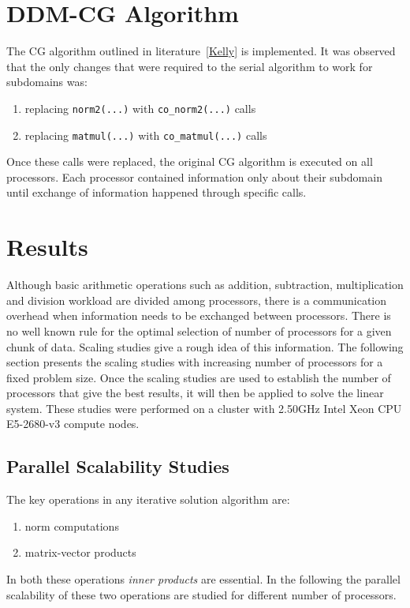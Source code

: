 \documentclass[12pt]{report}
\begin{document}
\section{DDM-CG Algorithm}

The CG algorithm outlined in literature~\ref{Kelly} is implemented. It
was observed that the only changes that were required to the serial
algorithm to work for subdomains was:
\begin{enumerate}
\item replacing \texttt{norm2(...)} with \texttt{co\_norm2(...)} calls
\item replacing \texttt{matmul(...)} with \texttt{co\_matmul(...)} calls
\end{enumerate}
Once these calls were replaced, the original CG algorithm is
executed on all processors. Each processor contained information only
about their subdomain until exchange of information happened through
specific calls.

\section{Results}

Although basic arithmetic operations such as addition, subtraction,
multiplication and division workload are divided among processors,
there is a communication overhead when information needs to be
exchanged between processors. There is no well known rule for the
optimal selection of number of processors for a given chunk of
data. Scaling studies give a rough idea of this information.  The
following section presents the scaling studies with increasing number
of processors for a fixed problem size. Once the scaling studies are
used to establish the number of processors that give the best results,
it will then be applied to solve the linear system.  These studies
were performed on a cluster with 2.50GHz Intel Xeon CPU E5-2680-v3
compute nodes.

\subsection{Parallel Scalability Studies}


The key operations in any iterative solution algorithm are:
\begin{enumerate}
\item norm computations
\item matrix-vector products
\end{enumerate}
In both these operations \emph{inner products} are essential. In the
following the parallel scalability of these two operations are studied
for different number of processors.
\end{document}
